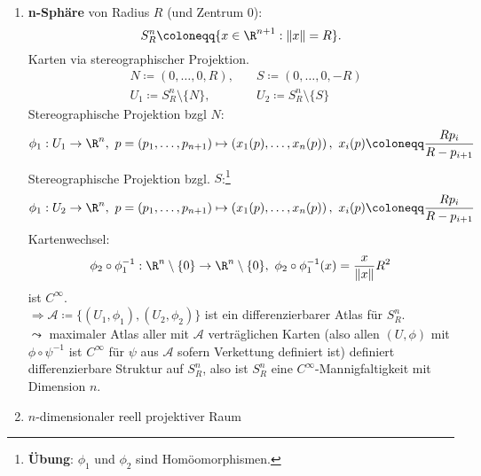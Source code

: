 \begin{example}
  \
  \begin{enumerate}
    \item \textbf{n-Sphäre} von Radius \( R \) (und Zentrum \( 0 \)):
      \begin{equation*}
        S_R^n \coloneqq \{ x \in \R^{n+1} : \Vert x \Vert = R \}\text{.}
      \end{equation*}
      Karten via stereographischer Projektion.
      \begin{align*}
        &N \coloneqq (0, \dots, 0, R), \quad &S \coloneqq (0, \dots, 0, -R) \\
        &U_1 \coloneqq S_R^n \setminus \{ N \}, \quad &U_2 \coloneqq S_R^n \setminus \{ S \}
      \end{align*}
      Stereographische Projektion bzgl \( N \):
      \begin{equation*}
        \phi_1 : U_1 \to \R^n, \ p = (p_1, \dots, p_{n+1}) \mapsto \left( x_1(p), \dots, x_n(p) \right), \ x_i(p) \coloneqq \frac{Rp_i}{R-p_{i+1}}
      \end{equation*}
      Stereographische Projektion bzgl. \( S \):\footnote{\textbf{Übung}: \( \phi_1 \) und \( \phi_2 \) sind Homöomorphismen.}
      \begin{equation*}
        \phi_1 : U_2 \to \R^n, \ p = (p_1, \dots, p_{n+1}) \mapsto \left( x_1(p), \dots, x_n(p) \right), \ x_i(p) \coloneqq \frac{Rp_i}{R-p_{i+1}}
      \end{equation*}
      Kartenwechsel:
      \begin{equation*}
        \phi_2 \circ \phi_1^{-1} : \R^n \setminus \{ 0 \} \to \R^n \setminus \{ 0 \}, \ \phi_2 \circ \phi_1^{-1}(x) = \frac{x}{\Vert x \Vert}R^2
      \end{equation*}
      ist \( C^\infty \). \\
      \( \Rightarrow \mathcal{A} \coloneqq \{ (U_1, \phi_1), (U_2, \phi_2) \} \) ist ein differenzierbarer Atlas für \( S_R^n \). \\
      \( \leadsto \) maximaler Atlas aller mit \( \mathcal{A} \) verträglichen Karten (also allen \( (U, \phi) \) mit \( \phi \circ \psi^{-1} \) ist \( C^\infty \) für \( \psi \) aus \( \mathcal{A} \) sofern Verkettung definiert ist) definiert differenzierbare Struktur auf \( S_R^n \), also ist \( S_R^n \) eine \( C^\infty \)-Mannigfaltigkeit mit Dimension \( n \).
    \item \( n \)-dimensionaler reell projektiver Raum
      \begin{equation*}

\end{equation*}
\end{enumerate}
\end{example}
